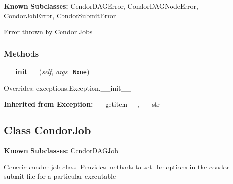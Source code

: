 \textbf{Known Subclasses:}
CondorDAGError,
    CondorDAGNodeError,
    CondorJobError,
    CondorSubmitError

Error thrown by Condor Jobs



  \subsubsection{Methods}

    \label{pipeline:CondorError:__init__}
    \vspace{0.5ex}

    \noindent\begin{boxedminipage}{\textwidth}

    \raggedright \textbf{\_\_init\_\_}(\textit{self}, \textit{args}=\texttt{N\-o\-n\-e\-})

      Overrides: exceptions.Exception.\_\_init\_\_

    \end{boxedminipage}

  \textbf{Inherited from Exception:}
    \_\_getitem\_\_,
    \_\_str\_\_


\subsection{Class CondorJob}

    \label{pipeline:CondorJob}
\textbf{Known Subclasses:} CondorDAGJob

Generic condor job class. Provides methods to set the options in the 
condor submit file for a particular executable



